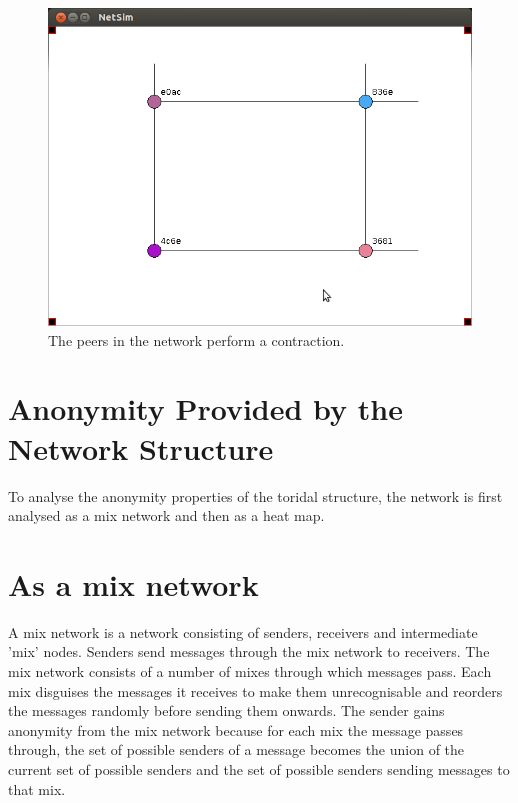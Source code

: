 \documentclass[ %
                    author={Luke Murray},
                supervisor={Dr. Simon Hollis},
                     title={Shadow Peer-to-Peer Networks},
                  subtitle={},
                    degree={MEng},
                      year={2013} ]{thesis}
\begin{document}
\begin{figure}[h]
\begin{minipage}[b]{0.45\linewidth}
    \end{minipage}
    \begin{minipage}[b]{0.45\linewidth}
        \centering
        \includegraphics[width=\linewidth]{sim_pics/balance_10.png}
        \caption{The peers in the network perform a contraction.}
        \label{sim_balance7}
    \end{minipage}
\end{figure}

\section{Anonymity Provided by the Network Structure}

To analyse the anonymity properties of the toridal structure, the network is first analysed as a mix network and then as a heat map.

\section{As a mix network}

A mix network is a network consisting of senders, receivers and intermediate 'mix' nodes. Senders send messages through the mix network to receivers. The mix network consists of a number of mixes through which messages pass. Each mix disguises the messages it receives to make them unrecognisable and reorders the messages randomly before sending them onwards. The sender gains anonymity from the mix network because for each mix the message passes through, the set of possible senders of a message becomes the union of the current set of possible senders and the set of possible senders sending messages to that mix.
\end{document}
